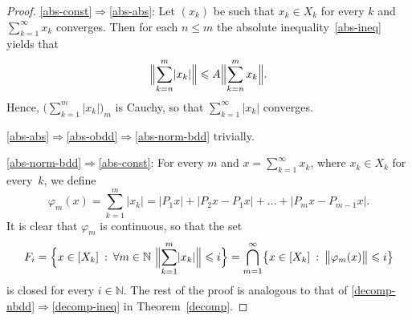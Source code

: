 \documentclass[12pt]{amsart}
\theoremstyle{plain}
\theoremstyle{definition}
\newcommand{\abs}[1]{\lvert#1\rvert}
\newcommand{\bignorm}[1]{\bigl\lVert#1\bigr\rVert}
\newcommand{\Bigabs}[1]{\Bigl\lvert#1\Bigr\rvert}
\newcommand{\Bignorm}[1]{\Bigl\lVert#1\Bigr\rVert}
\renewcommand{\mid}{\::\:}
\renewcommand{\le}{\leqslant}
\begin{document}
\begin{proof}
  \eqref{abs-const}$\Rightarrow$\eqref{abs-abs}: Let $(x_k)$ be such
  that $x_k\in X_k$ for every $k$ and $\sum_{k=1}^\infty x_k$
  converges. Then for each $n\le m$ the absolute
  inequality~\eqref{abs-ineq} yields that
  \begin{displaymath}
    \Bignorm{\sum_{k=n}^m\abs{x_k}}
    \le A\Bignorm{\sum_{k=n}^mx_k}.
   \end{displaymath}
   Hence, $\bigl(\sum_{k=1}^m\abs{x_k}\bigr)_m$ is Cauchy, so that
   $\sum_{k=1}^\infty\abs{x_k}$ converges.



  \eqref{abs-abs}$\Rightarrow$\eqref{abs-obdd}$\Rightarrow$\eqref{abs-norm-bdd}
  trivially.

  \eqref{abs-norm-bdd}$\Rightarrow$\eqref{abs-const}:
  For every $m$ and $x=\sum_{k=1}^\infty x_k$, where $x_k\in X_k$ for
  every~$k$, we define
  \begin{displaymath}
    \varphi_m(x)=\sum_{k=1}^m\abs{x_k}
    =\abs{P_1x}+\abs{P_2x-P_1x}+\dots+\abs{P_mx-P_{m-1}x}.
  \end{displaymath}
  It is clear that $\varphi_m$ is continuous, so that the set
  \begin{displaymath}
    F_i=\Bigl\{x\in[X_k]\mid
    \forall m\in\mathbb N\ \Bignorm{\sum_{k=1}^m\abs{x_k}}\le i\Bigr\}
    =\bigcap_{m=1}^\infty\bigl\{x\in[X_k]\mid \bignorm{\varphi_m(x)}\le i\bigr\}
  \end{displaymath}
  is closed for every $i\in\mathbb N$. The rest of the proof is
  analogous to that of
  \eqref{decomp-nbdd}$\Rightarrow$\eqref{decomp-ineq} in Theorem~\ref{decomp}.
\end{proof}
\end{document}
